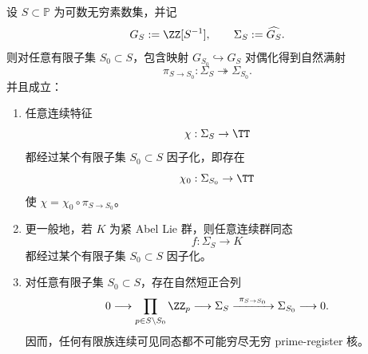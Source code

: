 \begin{corollary}\label{cor:xi-time-part60e-infinite-solenoid-finite-visible-factorization}
设 \(S\subset\mathbb P\) 为可数无穷素数集，并记
\[
G_S:=\ZZ[S^{-1}],
\qquad
\Sigma_S:=\widehat{G_S}.
\]
则对任意有限子集 \(S_0\subset S\)，包含映射 \(G_{S_0}\hookrightarrow G_S\) 对偶化得到自然满射
\[
\pi_{S\to S_0}:\Sigma_S\twoheadrightarrow \Sigma_{S_0}.
\]
并且成立：
\begin{enumerate}
  \item 任意连续特征
  \[
  \chi:\Sigma_S\to \TT
  \]
  都经过某个有限子集 \(S_0\subset S\) 因子化，即存在
  \[
  \chi_0:\Sigma_{S_0}\to \TT
  \]
  使 \(\chi=\chi_0\circ\pi_{S\to S_0}\)。
  \item 更一般地，若 \(K\) 为紧 Abel Lie 群，则任意连续群同态
  \[
  f:\Sigma_S\to K
  \]
  都经过某个有限子集 \(S_0\subset S\) 因子化。
  \item 对任意有限子集 \(S_0\subset S\)，存在自然短正合列
  \[
  0\longrightarrow \prod_{p\in S\setminus S_0}\ZZ_p
  \longrightarrow \Sigma_S
  \xrightarrow{\ \pi_{S\to S_0}\ }
  \Sigma_{S_0}
  \longrightarrow 0.
  \]
  因而，任何有限族连续可见同态都不可能穷尽无穷 prime-register 核。
\end{enumerate}
\end{corollary}

